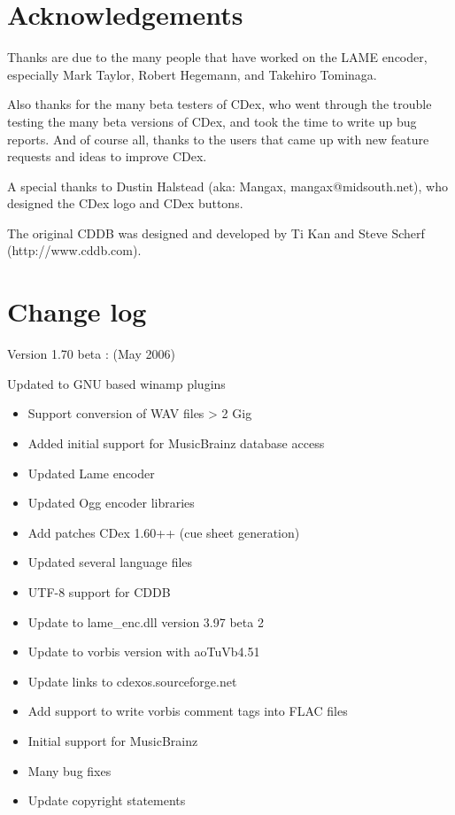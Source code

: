 \section{Acknowledgements}


Thanks are due to the many people that have worked on the LAME encoder, especially 
Mark Taylor, Robert Hegemann, and Takehiro Tominaga.

Also thanks for the many beta testers of CDex, who went through the trouble testing
the many beta versions of CDex, and took the time to write up bug reports. And of 
course all, thanks to the users that came up with new feature requests and ideas to improve CDex.

A special thanks to Dustin Halstead (aka: Mangax, mangax@midsouth.net),
who designed the CDex logo and CDex buttons.

The original CDDB was designed and developed by Ti Kan and Steve Scherf
(http://www.cddb.com).



\section{Change log}

Version 1.70 beta : (May 2006)

Updated to GNU based winamp plugins

\begin{itemize}
\itemsep=0pt
\item Support conversion of WAV files > 2 Gig
\item Added initial support for MusicBrainz database access
\item Updated Lame encoder
\item Updated Ogg encoder libraries
\item Add patches CDex 1.60++ (cue sheet generation)
\item Updated several language files
\item UTF-8 support for CDDB
\item Update to lame_enc.dll version 3.97 beta 2
\item Update to vorbis version with aoTuVb4.51
\item Update links to cdexos.sourceforge.net
\item Add support to write vorbis comment tags into FLAC files
\item Initial support for MusicBrainz
\item Many bug fixes
\item Update copyright statements
\end{itemize}


